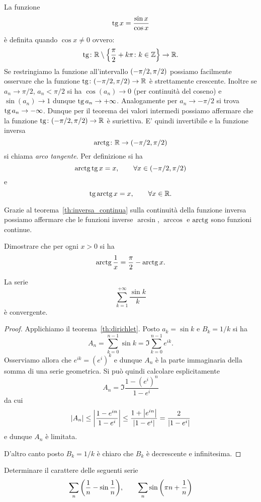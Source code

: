 La funzione
\[
\operatorname{tg} x = \frac{\sin x}{\cos x}
\]
è definita quando $\cos x\neq 0$ ovvero:
\[
  \operatorname{tg} \colon \mathbb R \setminus{\left\{ \frac \pi 2+ k\pi\colon k\in \mathbb Z\right\}} \to \mathbb R.
\]
Se restringiamo la funzione all'intervallo ${\left( -\pi/2, \pi/2 \right)}$ possiamo
facilmente osservare che la funzione $\operatorname{tg}\colon(-\pi/2,\pi/2)\to \mathbb R$ è strettamente crescente. Inoltre se $a_n \to \pi/2$, $a_n<\pi/2$ si ha $\cos(a_n)\to 0$ (per continuità del coseno) e $\sin(a_n)\to 1$ dunque $\operatorname{tg} a_n\to +\infty$. Analogamente per $a_n \to -\pi/2$ si trova $\operatorname{tg} a_n \to -\infty$. Dunque per il teorema dei valori intermedi possiamo affermare che la funzione $\operatorname{tg}\colon(-\pi/2,\pi/2)\to \mathbb R$ è suriettiva. E' quindi invertibile
e la funzione inversa
\[
 \operatorname{arctg} \colon \mathbb R \to (-\pi/2,\pi/2)
\]
si chiama \emph{arco tangente}. Per definizione si ha
\[
  \operatorname{arctg} \operatorname{tg} x = x, \qquad \forall x \in (-\pi/2, \pi/2)
\]
e
\[
 \operatorname{tg}\operatorname{arctg} x = x, \qquad \forall x \in \mathbb R.
\]

Grazie al teorema~\ref{th:inversa_continua} sulla continuità della
funzione inversa possiamo
affermare che
le funzioni inverse $\arcsin$, $\arccos$ e $\operatorname{arctg}$ sono funzioni continue.

\begin{exercise}
Dimostrare che per ogni $x>0$ si ha
\[
  \operatorname{arctg} \frac 1 x = \frac \pi 2 - \operatorname{arctg} x.
\]
\end{exercise}

\begin{exercise}
La serie
\[
 \sum_{k=1}^{+\infty} \frac{\sin k}{k}
\]
è convergente.
\end{exercise}
\begin{proof}
Applichiamo il teorema~\ref{th:dirichlet}.
Posto $a_k = \sin k$ e $B_k=1/k$
si ha
\[
  A_n = \sum_{k=0}^{n-1} \sin k = \Im \sum_{k=0}^{n-1} e^{ik}.
\]
Osserviamo allora che $e^{ik}=(e^i)^k$ e dunque $A_n$ è la parte immaginaria
della somma di una serie geometrica. 
Si può quindi calcolare esplicitamente
\[
  A_n = \Im \frac{1-(e^i)^n}{1-e^i}
\]
da cui
\[
 {\left|A_n\right|} \le {\left|\frac{1-e^{in}}{1-e^i}\right|} \le \frac{1+{\left|e^{in}\right|}}{{\left|1-e^i\right|}}
 = \frac{2}{{\left|1-e^i\right|}}
\]
e dunque $A_n$ è limitata.

D'altro canto posto $B_k = 1/k$ è chiaro che $B_k$ è
decrescente e infinitesima.
\end{proof}

\begin{exercise}
Determinare il carattere delle seguenti serie
\[
  \sum_n {\left( \frac 1 n - \sin \frac 1 n \right)},\qquad
  \sum_n \sin{\left( \pi n + \frac 1 n \right)}
\]
\end{exercise}

